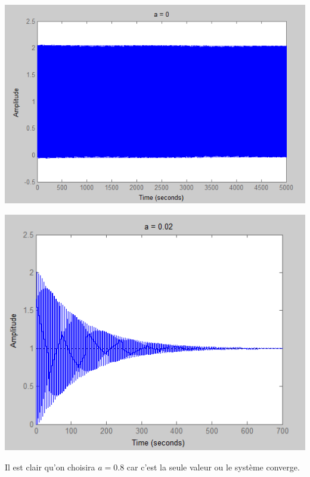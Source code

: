 		\begin{center}
	\includegraphics[scale=0.5]{a0.png}
	\label{fig14} 
	\end{center}
	
		\begin{center}
	\includegraphics[scale=0.5]{a2.png}
	\label{fig15} 
	\end{center}
 	
 		\par Il est clair qu'on choisira $a=0.8$ car c'est la seule valeur ou le système converge.
 		
